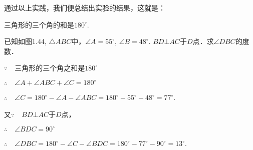 通过以上实践，我们便总结出实验的结果，这就是：

\begin{blk}{}
三角形的三个角的和是$180^{\circ}$.	
\end{blk}

\begin{example}
	已知如图1.44, $\triangle ABC$中，$\angle A=55^{\circ}$, $\angle B=48^{\circ}$. 
$BD\bot AC$于$D$点．求$\angle DBC$的度数．
\end{example}

\begin{figure}[htp]
	\centering
{}
	\caption{}
\end{figure}

\begin{solution}
$\because\quad $三角形的三个角之和是$180^{\circ}$

$\therefore\quad \angle A+\angle ABC+\angle C=180^{\circ}$

$\therefore\quad \angle C=180^{\circ}-\angle A-\angle ABC
=180^{\circ}-55^{\circ}-48^{\circ}=77^{\circ}$.

又$\because\quad BD\bot AC$于$D$点，

$\therefore\quad \angle BDC=90^{\circ}$

$\therefore\quad \angle DBC=180^{\circ}-\angle C-\angle BDC
=180^{\circ}-77^{\circ}-90^{\circ}=13^{\circ}$.
\end{solution}

